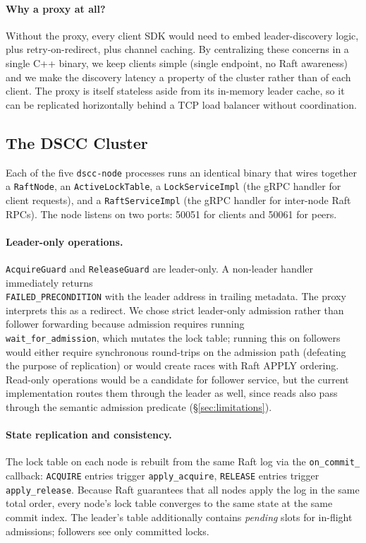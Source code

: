 \documentclass[sigconf]{acmart}
\begin{document}
\paragraph{\textbf{Why a proxy at all?}}
Without the proxy, every client SDK would need to embed leader-discovery
logic, plus retry-on-redirect, plus channel caching. By centralizing
these concerns in a single C++ binary, we keep clients simple
(single endpoint, no Raft awareness) and we make the discovery latency a
property of the cluster rather than of each client. The proxy is itself
stateless aside from its in-memory leader cache, so it can be replicated
horizontally behind a TCP load balancer without coordination.

\subsection{The DSCC Cluster}
\label{sec:cluster}

Each of the five \texttt{dscc-node} processes runs an identical binary
that wires together a \texttt{RaftNode}, an \texttt{ActiveLockTable}, a
\texttt{LockServiceImpl} (the gRPC handler for client requests), and a
\texttt{RaftServiceImpl} (the gRPC handler for inter-node Raft RPCs). The
node listens on two ports: 50051 for clients and 50061 for peers.

\paragraph{Leader-only operations.}
\texttt{AcquireGuard} and \texttt{ReleaseGuard} are leader-only.
A non-leader handler immediately returns \\
\texttt{FAILED\_PRECONDITION} with the leader address in trailing metadata.
The proxy interprets this as a redirect. We chose strict leader-only
admission rather than follower forwarding because admission requires
running \\ \texttt{wait\_for\_admission}, which mutates the lock table; running
this on followers would either require synchronous round-trips on the
admission path (defeating the purpose of replication) or would create races
with Raft APPLY ordering. Read-only operations would be a candidate for
follower service, but the current implementation routes them through the
leader as well, since reads also pass through the semantic admission
predicate (\S\ref{sec:limitations}).

\paragraph{State replication and consistency.}
The lock table on each node is rebuilt from the same Raft log via the
\texttt{on\_commit\_} callback: \texttt{ACQUIRE} entries trigger
\texttt{apply\_acquire}, \texttt{RELEASE} entries trigger
\texttt{apply\_release}. Because Raft guarantees that all nodes apply the
log in the same total order, every node's lock table converges to the same
state at the same commit index. The leader's table additionally contains
\emph{pending} slots for in-flight admissions; followers see only
committed locks.
\end{document}
